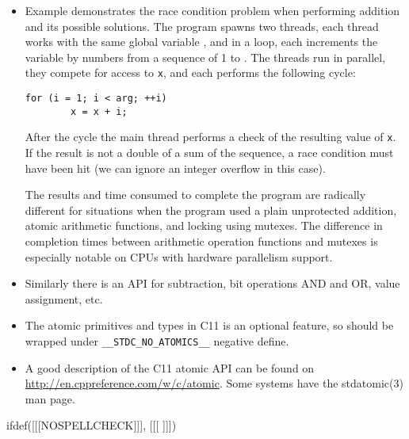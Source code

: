 \begin{itemize}
\item \label{ATOMIC_ADD} Example  demonstrates
the race condition problem when performing addition and its possible solutions.
The program spawns two threads, each thread works with the same global variable
, and in a loop, each increments the variable by numbers from a sequence
of 1 to .  The threads run in parallel, they compete for
access to \texttt{x}, and each performs the following cycle:

\begin{verbatim}
for (i = 1; i < arg; ++i)
        x = x + i;
\end{verbatim}

After the cycle the main thread performs a check of the resulting value of
\texttt{x}.   If the result is not a double of a sum of the sequence, a race
condition must have been hit (we can ignore an integer overflow in this case).
\par The results and time consumed to complete the program are radically
different for situations when the program used a plain unprotected addition,
atomic arithmetic functions, and locking using mutexes.  The difference in
completion times between arithmetic operation functions and mutexes is
especially notable on CPUs with hardware parallelism support.
\item Similarly there is an API for subtraction, bit operations AND and OR,
value assignment, etc.
\item The atomic primitives and types in C11 is an optional feature, so should
be wrapped under \texttt{\_\_STDC\_NO\_ATOMICS\_\_} negative define.
\item A good description of the C11 atomic API can be found on
\url{http://en.cppreference.com/w/c/atomic}. Some systems have the
stdatomic(3) man page.
\end{itemize}



ifdef([[[NOSPELLCHECK]]], [[[
]]])

